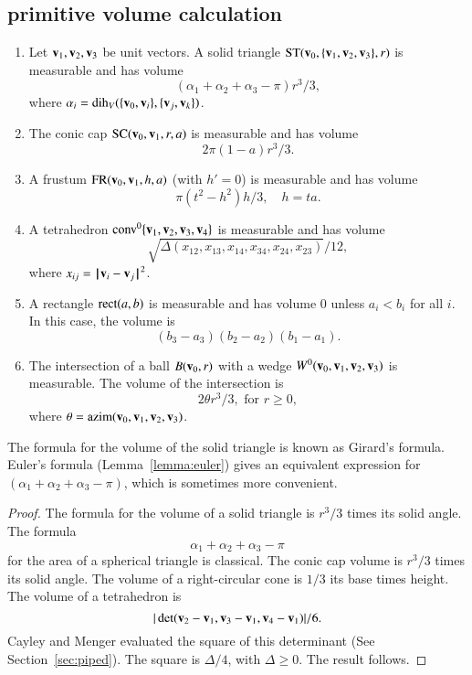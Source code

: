 \subsection{primitive volume calculation}\label{sec:primitive}

\begin{lemma} 
\begin{enumerate} 
 \item {} Let ${\mathbf v}_1,{\mathbf v}_2,{\mathbf v}_3$ be unit vectors.
   A solid triangle ${\operatorname{ST}}({\mathbf v}_0,\{{\mathbf v}_1,{\mathbf v}_2,{\mathbf v}_3\},r)$ is measurable and has volume
   $$
   (\alpha_1+\alpha_2+\alpha_3-\pi)r^3/3,
   $$
   where $\alpha_i = \operatorname{dih}_V(\{{\mathbf v}_0,{\mathbf v}_i\},\{{\mathbf v}_j,{\mathbf v}_k\})$.
  \item {} The conic cap ${\operatorname{SC}}({\mathbf v}_0,{\mathbf v}_1,r,a)$ is measurable and has volume
   $$
    2\pi(1-a) r^3/3.
   $$
 \item {} A frustum ${\operatorname{FR}}({\mathbf v}_0,{\mathbf v}_1,h,a)$ (with $h'=0$) 
is measurable and has volume
   $$
   \pi (t^2-h^2) h/3,\quad h = t a.
   $$
 \item{} A tetrahedron ${\operatorname{conv}}^0\{{\mathbf v}_1,{\mathbf v}_2,{\mathbf v}_3,{\mathbf v}_4\}$ is measurable and has volume
   $$
   \sqrt{\Delta(x_{12},x_{13},x_{14},x_{34},x_{24},x_{23})}/12,
   $$
   where $x_{ij} = {\hskip0.1em|\hskip-0.15em|\hskip0.1em}{\mathbf v}_i - {\mathbf v}_j{\hskip0.1em|\hskip-0.15em|\hskip0.1em}^2$.
\item{} A rectangle ${\operatorname{rect}}(a,b)$ is measurable and
has volume $0$ unless $a_i<b_i$ for all $i$.  In this case, the
volume is
$$(b_3-a_3)(b_2-a_2)(b_1-a_1).$$
 \item{} The intersection of a ball $B({\mathbf v}_0,r)$ with a wedge
 $W^0({\mathbf v}_0,{\mathbf v}_1,{\mathbf v}_2,{\mathbf v}_3)$ is measurable.  The volume of the intersection
is 
   $$
   2 \theta r^3/3,\text{ for } r \ge 0,
   $$
where $\theta = {\operatorname{azim}}({\mathbf v}_0,{\mathbf v}_1,{\mathbf v}_2,{\mathbf v}_3)$.

\end{enumerate}
\end{lemma}

The formula for the volume of the solid triangle is known as Girard's formula.
Euler's formula (Lemma~\ref{lemma:euler}) gives an
equivalent expression for $(\alpha_1+\alpha_2+\alpha_3-\pi)$, which is sometimes more convenient.
%
%

\begin{proof}
The formula for the volume of a solid triangle is $r^3/3$ times
its solid angle.  The formula 
   $$\alpha_1+\alpha_2+\alpha_3-\pi$$
for the area of a spherical triangle is classical.    
The conic cap volume is
$r^3/3$ times its solid angle.  
The volume of a right-circular cone is $1/3$ its base times height.
The volume of a tetrahedron is
   $$|\det({\mathbf v}_2-{\mathbf v}_1,{\mathbf v}_3-{\mathbf v}_1,{\mathbf v}_4-{\mathbf v}_1)|/6.$$
Cayley and Menger evaluated the square of this determinant (See Section~\ref{sec:piped}).  The square is
$\Delta/4$, with $\Delta\ge0$.  The result follows.
\end{proof}
%



